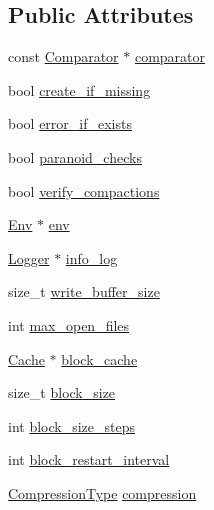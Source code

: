 \subsection*{Public Attributes}
\begin{DoxyCompactItemize}
\item 
const \hyperlink{structleveldb_1_1_comparator}{Comparator} $\ast$ \hyperlink{structleveldb_1_1_options_a7522fbf79de73c4f73ef8d9392e8c80b}{comparator}
\item 
bool \hyperlink{structleveldb_1_1_options_afe1b4e94164ff8f081b1c25bf1bcb62e}{create\+\_\+if\+\_\+missing}
\item 
bool \hyperlink{structleveldb_1_1_options_aff3b99b1b30a2dba9642adc6c912d5b7}{error\+\_\+if\+\_\+exists}
\item 
bool \hyperlink{structleveldb_1_1_options_a4263dcc655493100eecc9daf6737a10b}{paranoid\+\_\+checks}
\item 
bool \hyperlink{structleveldb_1_1_options_afce8ab26fcba29d761a587124034ae3c}{verify\+\_\+compactions}
\item 
\hyperlink{classleveldb_1_1_env}{Env} $\ast$ \hyperlink{structleveldb_1_1_options_aeb08bfe820e9c89f57446d6fbd2e6ea8}{env}
\item 
\hyperlink{classleveldb_1_1_logger}{Logger} $\ast$ \hyperlink{structleveldb_1_1_options_af5545cba00b0e9763ad0279a74acc429}{info\+\_\+log}
\item 
size\+\_\+t \hyperlink{structleveldb_1_1_options_a017f1f9558e6b3887434df29a16dac97}{write\+\_\+buffer\+\_\+size}
\item 
int \hyperlink{structleveldb_1_1_options_a25c6ea125fc63342d8fc25b2f7817be4}{max\+\_\+open\+\_\+files}
\item 
\hyperlink{classleveldb_1_1_cache}{Cache} $\ast$ \hyperlink{structleveldb_1_1_options_a4e87749ebac1ba28dff6bb63eb2059e5}{block\+\_\+cache}
\item 
size\+\_\+t \hyperlink{structleveldb_1_1_options_a715c7941b43db641e76e598aa9ab52a0}{block\+\_\+size}
\item 
int \hyperlink{structleveldb_1_1_options_a9917edbeb09e24c2fb3c0eec5f061178}{block\+\_\+size\+\_\+steps}
\item 
int \hyperlink{structleveldb_1_1_options_ac71d66ae44e481edc3922d3a139c30b4}{block\+\_\+restart\+\_\+interval}
\item 
\hyperlink{namespaceleveldb_a047a8e77a76becb82bab4720994f6f9b}{Compression\+Type} \hyperlink{structleveldb_1_1_options_abdaf09c8bb3a788636ffb86cb93b01ab}{compression}
\item 

\end{DoxyCompactItemize}
